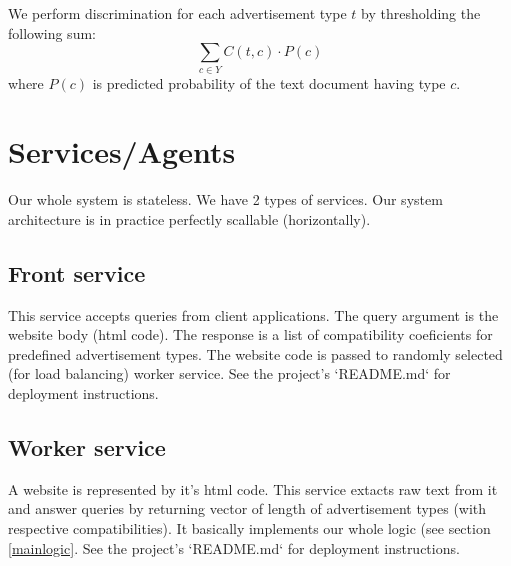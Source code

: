 \documentclass[a4paper]{article}
\begin{document}
We perform discrimination for each advertisement type $t$
by thresholding the following sum:
\begin{equation}
    \sum_{c\in{Y}} {C(t, c) \cdot P(c)}
\end{equation}
where $P(c)$ is predicted probability of the text document having type $c$.



\section{Services/Agents}
Our whole system is stateless.
We have 2 types of services.
Our system architecture is in practice perfectly scallable (horizontally).

\subsection{Front service}

This service accepts queries from client applications.
The query argument is the website body (html code).
The response is a list of compatibility coeficients for predefined advertisement types.
The website code is passed to randomly selected (for load balancing) worker service.
See the project's `README.md` for deployment instructions.


\subsection{Worker service}
A website is represented by it's html code.
This service extacts raw text from it and answer queries by returning vector of length of advertisement types
(with respective compatibilities).
It basically implements our whole logic (see section \ref{mainlogic}.
See the project's `README.md` for deployment instructions.
\end{document}
